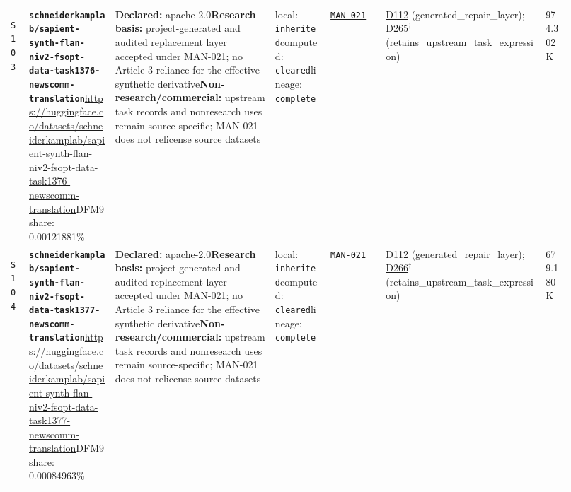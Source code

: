 \documentclass[9pt,a4paper]{article}
\newcommand{\srcid}[1]{\hypertarget{src:#1}{\texttt{#1}}}
\begin{document}
\begin{landscape}
\begin{longtable}{@{}L{0.03\linewidth}L{0.14\linewidth}L{0.26\linewidth}L{0.09\linewidth}L{0.09\linewidth}L{0.265\linewidth}L{0.045\linewidth}@{}}
\srcid{S103} & \textbf{\nolinkurl{schneiderkamplab/sapient-synth-flan-niv2-fsopt-data-task1376-newscomm-translation}}\newline \url{https://huggingface.co/datasets/schneiderkamplab/sapient-synth-flan-niv2-fsopt-data-task1376-newscomm-translation}\newline DFM9 share: 0.00121881\% & \textbf{Declared:} apache-2.0\newline \textbf{Research basis:} project-generated and audited replacement layer accepted under MAN-021; no Article 3 reliance for the effective synthetic derivative\newline \textbf{Non-research/commercial:} upstream task records and nonresearch uses remain source-specific; MAN-021 does not relicense source datasets & local: \texttt{inherited}\newline computed: \texttt{cleared}\newline lineage: \texttt{complete} & \hyperlink{manual:MAN-021}{\texttt{MAN-021}} & \hyperlink{dep:D112}{D112} (generated\_repair\_layer); \hyperlink{dep:D265}{D265}$^{\dagger}$ (retains\_upstream\_task\_expression) & 974.302K \\
\srcid{S104} & \textbf{\nolinkurl{schneiderkamplab/sapient-synth-flan-niv2-fsopt-data-task1377-newscomm-translation}}\newline \url{https://huggingface.co/datasets/schneiderkamplab/sapient-synth-flan-niv2-fsopt-data-task1377-newscomm-translation}\newline DFM9 share: 0.00084963\% & \textbf{Declared:} apache-2.0\newline \textbf{Research basis:} project-generated and audited replacement layer accepted under MAN-021; no Article 3 reliance for the effective synthetic derivative\newline \textbf{Non-research/commercial:} upstream task records and nonresearch uses remain source-specific; MAN-021 does not relicense source datasets & local: \texttt{inherited}\newline computed: \texttt{cleared}\newline lineage: \texttt{complete} & \hyperlink{manual:MAN-021}{\texttt{MAN-021}} & \hyperlink{dep:D112}{D112} (generated\_repair\_layer); \hyperlink{dep:D266}{D266}$^{\dagger}$ (retains\_upstream\_task\_expression) & 679.180K \\

\end{longtable}
\end{landscape}
\end{document}
